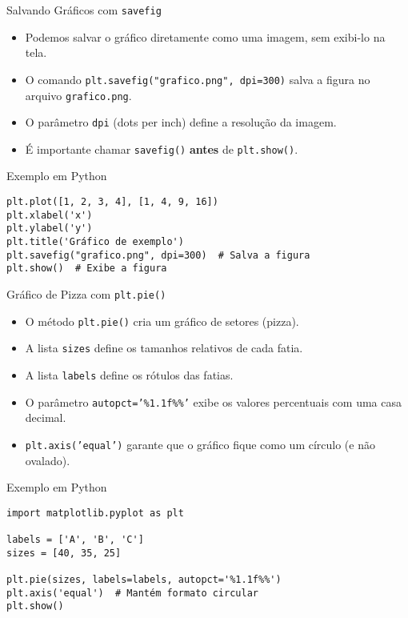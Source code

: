\begin{frame}[fragile]{Salvando Gráficos com \texttt{savefig}}
    \begin{itemize}
        \item Podemos salvar o gráfico diretamente como uma imagem, sem exibi-lo na tela.
        \item O comando \texttt{plt.savefig("grafico.png", dpi=300)} salva a figura no arquivo \texttt{grafico.png}.
        \item O parâmetro \texttt{dpi} (dots per inch) define a resolução da imagem.
        \item É importante chamar \texttt{savefig()} \textbf{antes} de \texttt{plt.show()}.
    \end{itemize}

    \begin{block}{Exemplo em Python}
        \begin{verbatim}
plt.plot([1, 2, 3, 4], [1, 4, 9, 16])
plt.xlabel('x')
plt.ylabel('y')
plt.title('Gráfico de exemplo')
plt.savefig("grafico.png", dpi=300)  # Salva a figura
plt.show()  # Exibe a figura
\end{verbatim}
    \end{block}
\end{frame}

\begin{frame}[fragile]{Gráfico de Pizza com \texttt{plt.pie()}}
    \begin{itemize}
        \item O método \texttt{plt.pie()} cria um gráfico de setores (pizza).
        \item A lista \texttt{sizes} define os tamanhos relativos de cada fatia.
        \item A lista \texttt{labels} define os rótulos das fatias.
        \item O parâmetro \texttt{autopct='\%1.1f\%\%'} exibe os valores percentuais com uma casa decimal.
        \item \texttt{plt.axis('equal')} garante que o gráfico fique como um círculo (e não ovalado).
    \end{itemize}

    \begin{block}{Exemplo em Python}
        \begin{verbatim}
import matplotlib.pyplot as plt

labels = ['A', 'B', 'C']
sizes = [40, 35, 25]

plt.pie(sizes, labels=labels, autopct='%1.1f%%')
plt.axis('equal')  # Mantém formato circular
plt.show()
\end{verbatim}
    \end{block}
\end{frame}

